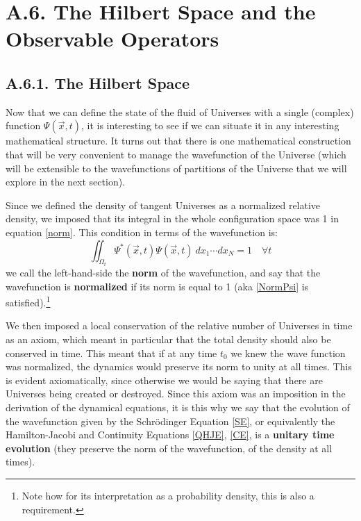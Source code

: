 \documentclass[11pt, a4paper]{article} %
\begin{document}
\newpage
{}
\section*{A.6. The Hilbert Space and the Observable Operators}

\subsection*{A.6.1. The Hilbert Space}

Now that we can define the state of the fluid of Universes with a single (complex) function $\Psi(\vec{x},t)$, it is interesting to see if we can situate it in any interesting mathematical structure. It turns out that there is one mathematical construction that will be very convenient to manage the wavefunction of the Universe (which will be extensible to the wavefunctions of partitions of the Universe that we will explore in the next section).

Since we defined the density of tangent Universes as a normalized relative density, we imposed that its integral in the whole configuration space was 1 in equation \eqref{norm}. This condition in terms of the wavefunction is:
\begin{equation}\label{NormPsi}
\iint_{\Omega_t}\Psi^*(\vec{x},t)\Psi(\vec{x},t)\ dx_1\cdots dx_N=1\quad \forall t
\end{equation}
we call the left-hand-side the {\bf norm} of the wavefunction, and say that the wavefunction is {\bf normalized} if its norm is equal to 1 (aka \eqref{NormPsi} is satisfied).\footnote{Note how for its interpretation as a probability density, this is also a requirement.}

We then imposed a local conservation of the relative number of Universes in time as an axiom, which meant in particular that the total density should also be conserved in time. This meant that if at any time $t_0$ we knew the wave function was normalized, the dynamics would preserve its norm to unity at all times. This is evident axiomatically, since otherwise we would be saying that there are Universes being created or destroyed. Since this axiom was an imposition in the derivation of the dynamical equations, it is this why we say that the evolution of the wavefunction given by the Schrödinger Equation \eqref{SE}, or equivalently the Hamilton-Jacobi and Continuity Equations \eqref{QHJE}, \eqref{CE}, is a {\bf unitary time evolution} (they preserve the norm of the wavefunction, of the density at all times).
\end{document}
